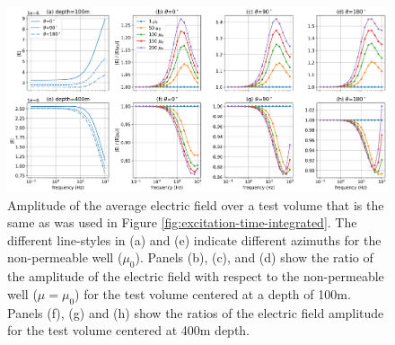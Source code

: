 \begin{figure}
    \begin{center}
    \includegraphics[width=\textwidth]{figures/excitation-freq.png}
    \end{center}
\caption{
    Amplitude of the average electric field over a test volume that is the same as was used in Figure \ref{fig:excitation-time-integrated}. The different line-styles in (a) and (e) indicate different azimuths for the non-permeable well ($\mu_0$). Panels (b), (c), and (d) show the ratio of the amplitude of the electric field with respect to the non-permeable well ($\mu=\mu_0$) for the test volume centered at a depth of 100m. Panels (f), (g) and (h) show the ratios of the electric field amplitude for the test volume centered at 400m depth.
}
\label{fig:excitation-freq}
\end{figure}




